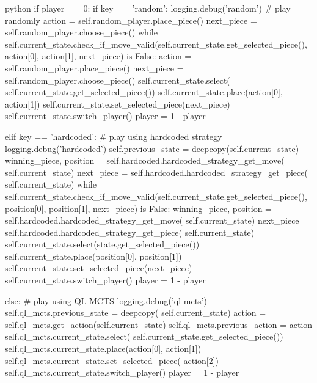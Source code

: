 \begin{mintedbox}{python}
                if player == 0:
                    if key == 'random':
                        logging.debug('random')
                        # play randomly
                        action = self.random_player.place_piece()
                        next_piece = self.random_player.choose_piece()
                        while self.current_state.check_if_move_valid(self.current_state.get_selected_piece(), action[0], action[1], next_piece) is False:
                            action = self.random_player.place_piece()
                            next_piece = self.random_player.choose_piece()
                        self.current_state.select(
                            self.current_state.get_selected_piece())
                        self.current_state.place(action[0], action[1])
                        self.current_state.set_selected_piece(next_piece)
                        self.current_state.switch_player()
                        player = 1 - player

                    elif key == 'hardcoded':
                        # play using hardcoded strategy
                        logging.debug('hardcoded')
                        self.previous_state = deepcopy(self.current_state)
                        winning_piece, position = self.hardcoded.hardcoded_strategy_get_move(
                            self.current_state)
                        next_piece = self.hardcoded.hardcoded_strategy_get_piece(
                            self.current_state)
                        while self.current_state.check_if_move_valid(self.current_state.get_selected_piece(), position[0], position[1], next_piece) is False:
                            winning_piece, position = self.hardcoded.hardcoded_strategy_get_move(
                                self.current_state)
                            next_piece = self.hardcoded.hardcoded_strategy_get_piece(
                                self.current_state)
                        self.current_state.select(state.get_selected_piece())
                        self.current_state.place(position[0], position[1])
                        self.current_state.set_selected_piece(next_piece)
                        self.current_state.switch_player()
                        player = 1 - player

                    else:
                        # play using QL-MCTS
                        logging.debug('ql-mcts')
                        self.ql_mcts.previous_state = deepcopy(
                            self.current_state)
                        action = self.ql_mcts.get_action(self.current_state)
                        self.ql_mcts.previous_action = action
                        self.ql_mcts.current_state.select(
                            self.current_state.get_selected_piece())
                        self.ql_mcts.current_state.place(action[0], action[1])
                        self.ql_mcts.current_state.set_selected_piece(
                            action[2])
                        self.ql_mcts.current_state.switch_player()
                        player = 1 - player


\end{mintedbox}
